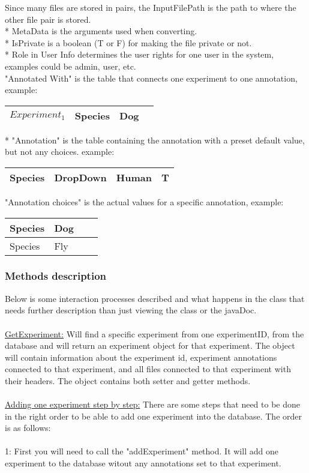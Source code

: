 Since many files are stored in pairs, the InputFilePath is the path to where the other file pair  is stored.\\
* MetaData is the arguments used when converting. \\
* IsPrivate is a boolean (T or F) for making the file private or not.\\
* Role in User Info determines the user rights for one user in the system, examples could be admin, user, etc.\\
"Annotated With" is the table that connects one experiment to one annotation, example:
\begin{center}
  \begin{tabular}{| l | l | l | l|}
    \hline
    $Experiment_1$ & Species & Dog\\ \hline
  \end{tabular}
\end{center}
* "Annotation" is the table containing the annotation with a preset default value, but not any choices. example:
\begin{center}
  \begin{tabular}{| l | l | l | l|}
    \hline
    Species & DropDown & Human & T \\ \hline
  \end{tabular}
\end{center}
"Annotation choices" is the actual values for a specific annotation, example:\\
\begin{center}
  \begin{tabular}{| l | l | l | l|}
    \hline
    Species & Dog \\ \hline
    Species & Fly \\ \hline
  \end{tabular}
\end{center}

\subsubsection{Methods description}
Below is some interaction processes described and what happens in the  class that needs further description than just viewing the class or the javaDoc.\\
\\
\underline{GetExperiment:} Will find a specific experiment from one experimentID, from the database and will return an experiment object for that experiment. The object will contain information about the experiment id, experiment annotations connected to that experiment, and all files connected to that experiment with their headers. The object contains both setter and getter methods. \\
\\
\underline{Adding one experiment step by step:}
There are some steps that need to be done in the right order to be able to add one experiment into the database. The order is as follows:\\
\\
1: First you will need to call the "addExperiment" method. It will add one experiment to the database witout any annotations set to that experiment. 

